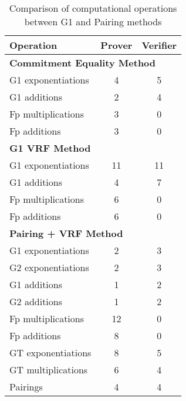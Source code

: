 \newpage
\begin{table}[h]
\centering
\begin{tabular}{|l|c|c|}
\hline
\textbf{Operation} & \textbf{Prover} & \textbf{Verifier} \\
\hline
\multicolumn{3}{|l|}{\textbf{Commitment Equality Method}} \\
\hline
G1 exponentiations & 4 & 5 \\
G1 additions & 2 & 4 \\
Fp multiplications & 3 & 0 \\
Fp additions & 3 & 0 \\
\hline
\multicolumn{3}{|l|}{\textbf{G1 VRF Method}} \\
\hline
G1 exponentiations & 11 & 11 \\
G1 additions & 4 & 7 \\
Fp multiplications & 6 & 0 \\
Fp additions & 6 & 0 \\
\hline
\multicolumn{3}{|l|}{\textbf{Pairing + VRF Method}} \\
\hline
G1 exponentiations & 2 & 3 \\
G2 exponentiations & 2 & 3 \\
G1 additions & 1 & 2 \\
G2 additions & 1 & 2 \\
Fp multiplications & 12 & 0 \\
Fp additions & 8 & 0 \\
GT exponentiations & 8 & 5 \\
GT multiplications & 6 & 4 \\
Pairings & 4 & 4 \\
\hline
\end{tabular}
\caption{Comparison of computational operations between G1 and Pairing methods}
\end{table}

